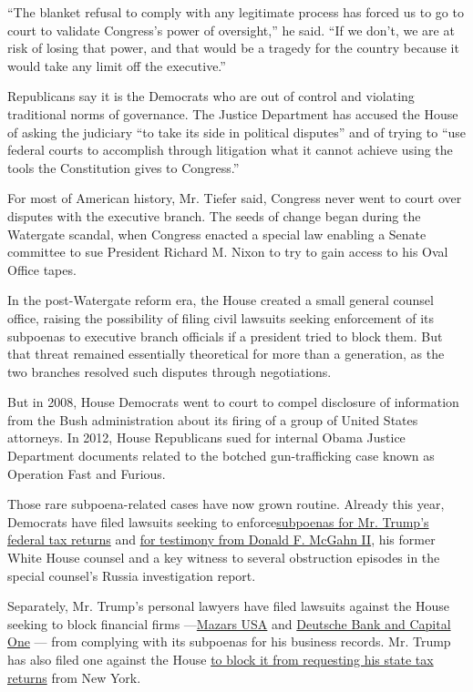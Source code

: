 ``The blanket refusal to comply with any legitimate process has forced
us to go to court to validate Congress's power of oversight,'' he said.
``If we don't, we are at risk of losing that power, and that would be a
tragedy for the country because it would take any limit off the
executive.''

Republicans say it is the Democrats who are out of control and violating
traditional norms of governance. The Justice Department has accused the
House of asking the judiciary ``to take its side in political disputes''
and of trying to ``use federal courts to accomplish through litigation
what it cannot achieve using the tools the Constitution gives to
Congress.''

For most of American history, Mr. Tiefer said, Congress never went to
court over disputes with the executive branch. The seeds of change began
during the Watergate scandal, when Congress enacted a special law
enabling a Senate committee to sue President Richard M. Nixon to try to
gain access to his Oval Office tapes.

In the post-Watergate reform era, the House created a small general
counsel office, raising the possibility of filing civil lawsuits seeking
enforcement of its subpoenas to executive branch officials if a
president tried to block them. But that threat remained essentially
theoretical for more than a generation, as the two branches resolved
such disputes through negotiations.

But in 2008, House Democrats went to court to compel disclosure of
information from the Bush administration about its firing of a group of
United States attorneys. In 2012, House Republicans sued for internal
Obama Justice Department documents related to the botched
gun-trafficking case known as Operation Fast and Furious.

Those rare subpoena-related cases have now grown routine. Already this
year, Democrats have filed lawsuits seeking to
enforce\href{https://www.nytimes.com/2019/07/02/us/politics/trump-taxes-lawsuit.html}{subpoenas
for Mr. Trump's federal tax returns} and
\href{https://www.nytimes.com/2019/08/07/us/politics/don-mcgahn-subpoena.html}{for
testimony from Donald F. McGahn II}, his former White House counsel and
a key witness to several obstruction episodes in the special counsel's
Russia investigation report.

Separately, Mr. Trump's personal lawyers have filed lawsuits against the
House seeking to block financial firms
---\href{https://www.nytimes.com/2019/04/22/us/politics/trump-sues-congress.htmlhttps://www.nytimes.com/2019/04/22/us/politics/trump-sues-congress.html}{}\href{https://www.nytimes.com/2019/04/22/us/politics/trump-sues-congress.html}{Mazars
USA} and
\href{https://www.nytimes.com/2019/04/29/us/politics/trump-lawsuit-deutsche-bank.html}{Deutsche
Bank and Capital One} --- from complying with its subpoenas for his
business records. Mr. Trump has also filed one against the House
\href{https://www.nytimes.com/2019/07/23/us/politics/trump-tax-returns-new-york.html}{to
block it from requesting his state tax returns} from New York.


